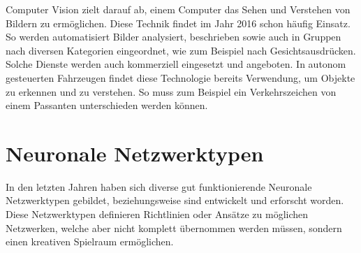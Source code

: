 Computer Vision zielt darauf ab, einem Computer das Sehen und Verstehen von Bildern zu ermöglichen. 
Diese Technik findet im Jahr 2016 schon häufig Einsatz. 
So werden automatisiert Bilder analysiert, beschrieben sowie auch in Gruppen nach diversen Kategorien eingeordnet, wie zum Beispiel nach Gesichtsausdrücken.
Solche Dienste werden auch kommerziell eingesetzt und angeboten. 
In autonom gesteuerten Fahrzeugen findet diese Technologie bereits Verwendung, um Objekte zu erkennen und zu verstehen. 
So muss zum Beispiel ein Verkehrszeichen von einem Passanten unterschieden werden können.




\section{Neuronale Netzwerktypen}

In den letzten Jahren haben sich diverse gut funktionierende Neuronale Netzwerktypen gebildet, beziehungsweise sind entwickelt und erforscht worden. 
Diese Netzwerktypen definieren Richtlinien oder Ansätze zu möglichen Netzwerken, welche aber nicht komplett übernommen werden müssen, sondern einen kreativen Spielraum ermöglichen. \\


